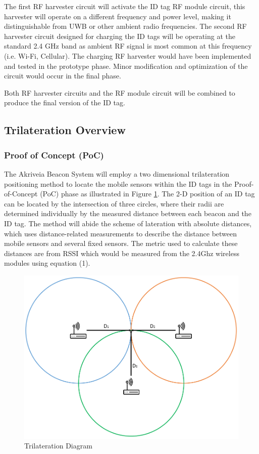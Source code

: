 \bigskip
The first RF harvester circuit will activate the ID tag RF module circuit, this harvester will operate on a different frequency and power level, making it distinguishable from UWB or other ambient radio frequencies. The second RF harvester circuit designed for charging the ID tags will be operating at the standard 2.4 GHz band as ambient RF signal is most common at this frequency (i.e. Wi-Fi, Cellular). The charging RF harvester would have been implemented and tested in the prototype phase. Minor modification and optimization of the circuit would occur in the final phase.

\bigskip
Both RF harvester circuits and the RF module circuit will be combined to produce the final version of the ID tag.

\break
\subsection{Trilateration Overview}
\bigskip
\subsubsection{Proof of Concept (PoC)}
The Akriveia Beacon System will employ a two dimensional trilateration positioning method to locate the mobile sensors within the ID tags in the Proof-of-Concept (PoC) phase as illustrated in Figure \ref{Tri}. The 2-D position of an ID tag can be located by the intersection of three circles, where their radii are determined individually by the measured distance between each beacon and the ID tag. The method will abide the scheme of lateration with absolute distances, which uses distance-related measurements to describe the distance between mobile sensors and several fixed sensors. The metric used to calculate these distances are from RSSI which would be measured from the 2.4Ghz wireless modules using equation (1).
\medskip
\begin{figure}[h!]
    \centering
    \includegraphics[scale=0.40]{./images/Tri.png}
    \caption{Trilateration Diagram}
    \label{Tri}
\end{figure}

